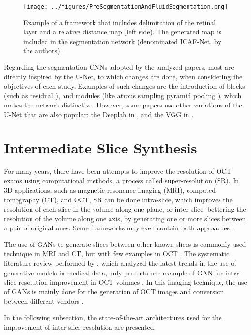 \par
\begin{figure}[!ht]
	\centering
	\texttt{[image: ../figures/PreSegmentationAndFluidSegmentation.png]}
	\caption{Example of a framework that includes delimitation of the retinal layer and a relative distance map (left side). The generated map is included in the segmentation network (denominated ICAF-Net, by the authors) \parencite{Tang2022}.}
	\label{fig:PreSegmentationAndFluidSegmentation}
\end{figure}
\par
Regarding the segmentation CNNs adopted by the analyzed papers, most are directly inspired by the U-Net, to which changes are done, when considering the objectives of each study. Examples of such changes are the introduction of blocks (such as residual \parencite{Mantel2021, Zhang2023, Liu2024, Hassan2021b, Hassan2021a, Padilla2022}), and modules (like atrous sampling pyramid pooling \parencite{Hassan2021b, Hassan2021a, Hu2019, Sappa2021}), which makes the network distinctive. However, some papers use other variations of the U-Net that are also popular: the Deeplab \parencite{LChen2018} in \textcite{Hassan2021a, Li2023}, and the VGG \parencite{Simonyan2014} in \textcite{Padilla2022, Hassan2021b}.

\section{Intermediate Slice Synthesis}
For many years, there have been attempts to improve the resolution of OCT exams using computational methods, a process called super-resolution (SR). In 3D applications, such as magnetic resonance imaging (MRI), computed tomography (CT), and OCT, SR can be done intra-slice, which improves the resolution of each slice in the volume along one plane, or inter-slice, bettering the resolution of the volume along one axis, by generating one or more slices between a pair of original ones. Some frameworks may even contain both approaches \parencite{You2020}.
\par
The use of GANs to generate slices between other known slices is commonly used technique in MRI and CT, but with few examples in OCT \parencite{You2020}. The systematic literature review performed by \textcite{Ibrahim2024}, which analyzed the latest trends in the use of generative models in medical data, only presents one example of GAN for inter-slice resolution improvement in OCT volumes \parencite{Lopez2023}. In this imaging technique, the use of GANs is mainly done for the generation of OCT images and conversion between different vendors \parencite{Ibrahim2024}.
\par
In the following subsection, the state-of-the-art architectures used for the improvement of inter-slice resolution are presented.


